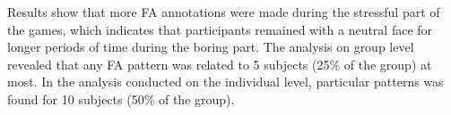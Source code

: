 Results show that more FA annotations were made during the stressful part of the games, which indicates that participants remained with a neutral face for longer periods of time during the boring part. The analysis on group level revealed that any FA pattern was related to 5 subjects (25\% of the group) at most. In the analysis conducted on the individual level, particular patterns was found for 10 subjects (50\% of the group).

